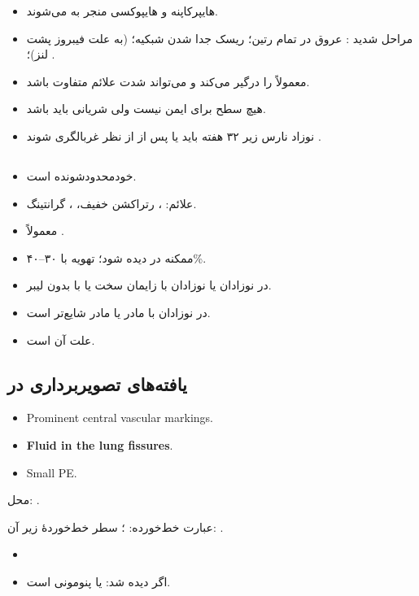 \documentclass[12pt,a4paper]{article}
\begin{document}
\begin{itemize}
\item هایپرکاپنه و هایپوکسی منجر به  می‌شوند.
\item مراحل شدید : عروق در تمام رتین؛ ریسک جدا شدن شبکیه؛  (به علت فیبروز پشت لنز)؛ .
\item معمولاً   را درگیر می‌کند و می‌تواند شدت علائم متفاوت باشد.
\item هیچ سطح  برای  ایمن نیست ولی  شریانی  باید باشد.
\item نوزاد نارس زیر ۳۲ هفته باید  یا پس از  از نظر  غربالگری شوند .
\end{itemize}
\subsection*{}
\begin{itemize}
\item خودمحدودشونده است.
\item علائم: ، رتراکشن خفیف، ، گرانتینگ.
\item معمولاً .
\item ممکنه در   دیده شود؛ تهویه با  ۳۰–۴۰\%.
\item {} در نوزادان  یا نوزادان با زایمان سخت یا با  بدون لیبر.
\item {} در نوزادان با مادر  یا مادر  شایع‌تر است.
\item علت آن  است.
\end{itemize}

\subsection*{یافته‌های تصویربرداری در }
\begin{latin}
\begin{itemize}
\item Prominent central vascular markings.
\item \textbf{Fluid in the lung fissures}.
\item Small PE.
\end{itemize}
\end{latin}
محل: .
\par عبارت خط‌خورده: ؛ سطر خط‌خوردهٔ زیر آن: .
\begin{itemize}
\item {}
\item اگر دیده شد:  یا پنومونی است.
\end{itemize}
\end{document}
